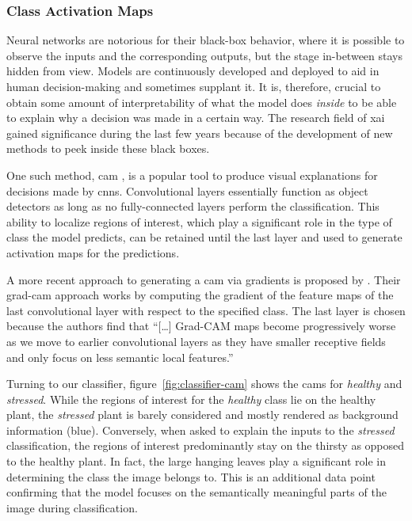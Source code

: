\documentclass[final]{vutinfth} %
\begin{document}
\subsubsection{Class Activation Maps}
\label{sssec:classifier-cam}

Neural networks are notorious for their black-box behavior, where it
is possible to observe the inputs and the corresponding outputs, but
the stage in-between stays hidden from view. Models are continuously
developed and deployed to aid in human decision-making and sometimes
supplant it. It is, therefore, crucial to obtain some amount of
interpretability of what the model does \emph{inside} to be able to
explain why a decision was made in a certain way. The research field
of \gls{xai} gained significance during the last few years because of
the development of new methods to peek inside these black boxes.

One such method, \gls{cam} \cite{zhou2015}, is a popular tool to
produce visual explanations for decisions made by
\glspl{cnn}. Convolutional layers essentially function as object
detectors as long as no fully-connected layers perform the
classification. This ability to localize regions of interest, which
play a significant role in the type of class the model predicts, can
be retained until the last layer and used to generate activation maps
for the predictions.

A more recent approach to generating a \gls{cam} via gradients is
proposed by \textcite{selvaraju2020}. Their \gls{grad-cam} approach
works by computing the gradient of the feature maps of the last
convolutional layer with respect to the specified class. The last
layer is chosen because the authors find that ``[…]  Grad-CAM maps
become progressively worse as we move to earlier convolutional layers
as they have smaller receptive fields and only focus on less semantic
local features.''~\cite[p.5]{selvaraju2020}

Turning to our classifier, figure~\ref{fig:classifier-cam} shows the
\glspl{cam} for \emph{healthy} and \emph{stressed}. While the regions
of interest for the \emph{healthy} class lie on the healthy plant, the
\emph{stressed} plant is barely considered and mostly rendered as
background information (blue). Conversely, when asked to explain the
inputs to the \emph{stressed} classification, the regions of interest
predominantly stay on the thirsty as opposed to the healthy plant. In
fact, the large hanging leaves play a significant role in determining
the class the image belongs to. This is an additional data point
confirming that the model focuses on the semantically meaningful parts
of the image during classification.
\end{document}
